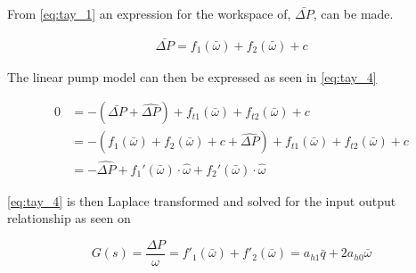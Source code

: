 From \eqref{eq:tay_1} an expression for the workspace of, $\bar{\Delta P}$, can be made.

\begin{equation}
\begin{split}
\bar{\Delta P} = f_{1}(\bar{\omega}) + f_{2}(\bar{\omega}) + c
\end{split}
\label{eq:tay_3}
\end{equation}

The linear pump model can then be expressed as seen in \eqref{eq:tay_4}

\begin{equation}
\begin{split}
0 &= -(\bar{\Delta P} + \hat{\Delta P}) + f_{t1}(\bar{\omega}) + f_{t2}(\bar{\omega}) + c\\
  &= -(f_{1}(\bar{\omega}) + f_{2}(\bar{\omega}) + c + \hat{\Delta P}) + f_{t1}(\bar{\omega}) + f_{t2}(\bar{\omega}) + c \\ 
  &= -\hat{\Delta P} + f_1'(\bar{\omega})\cdot\hat{\omega} + f_2'(\bar{\omega})\cdot\hat{\omega}
\end{split}
\label{eq:tay_4}
\end{equation}

\eqref{eq:tay_4} is then Laplace transformed and solved for the input output relationship as seen on 

\begin{equation}
G(s) = \frac{\Delta P}{\omega} = f'_1(\bar{\omega}) + f'_2(\bar{\omega}) = a_{h1}\bar{q} + 2a_{h0}\bar{\omega}
\end{equation}




